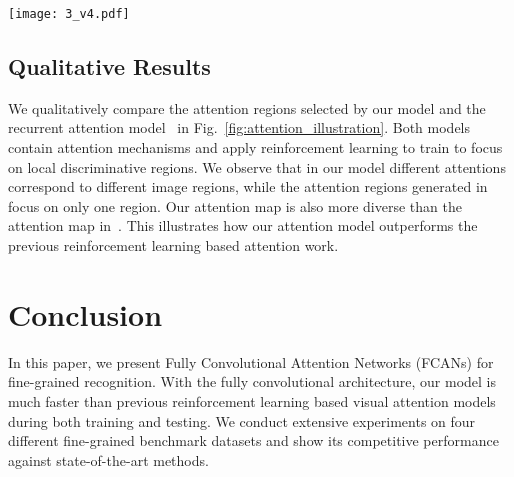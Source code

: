 \documentclass[10pt,twocolumn,letterpaper]{article}
\begin{document}
\begin{figure*}[t]
\begin{center}
\texttt{[image: 3\_v4.pdf]}
\end{center}
\caption{Qualitative comparison between our method (left) and recurrent attention~\cite{sermanet2014attention} (right) on different datasets.
On the left, we plot the first two attention regions regenerated by FCAN, which corresponds to $4\times4$ and $8\times8$ attention regions respectively (lighter color indicates higher score).
On the right, we also show the first two selected regions by~\cite{sermanet2014attention} using our implementation.
}
\label{fig:attention_illustration}
\vspace{-8pt}
\end{figure*}

\subsection{Qualitative Results}


We qualitatively compare the attention regions selected by our model and the recurrent attention model~\cite{sermanet2014attention} in Fig.~\ref{fig:attention_illustration}.
Both models contain attention mechanisms and apply reinforcement learning to train to focus on local discriminative regions.
We observe that in our model different attentions correspond to different image regions, while the attention regions generated in~\cite{sermanet2014attention} focus on only one region.
Our attention map is also more diverse than the attention map in~\cite{sermanet2014attention}.
This illustrates how our attention model outperforms the previous reinforcement learning based attention work.



\section{Conclusion}
In this paper, we present Fully Convolutional Attention Networks (FCANs) for fine-grained recognition.
With the fully convolutional architecture, our model is much faster than previous reinforcement learning based visual attention models during both training and testing.
We conduct extensive experiments on four different fine-grained benchmark datasets and show its competitive performance against state-of-the-art methods.


\small


\end{document}
